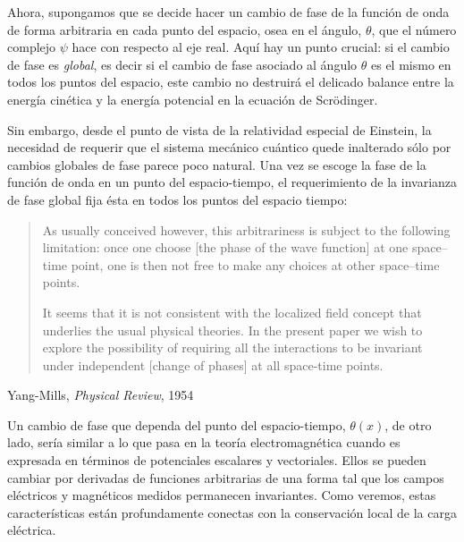 \begin{frame}
Ahora, supongamos que se decide hacer un cambio de fase de la función de onda de forma arbitraria en cada punto del espacio, osea en el ángulo, $\theta$, que el número complejo $\psi$ hace con respecto al eje real. Aquí hay un punto crucial: si el cambio de fase es \emph{global}, es decir si el cambio de fase asociado al ángulo $\theta$ es el mismo en todos los puntos del espacio, este cambio no destruirá el delicado balance entre la energía cinética y la energía potencial en la ecuación de Scrödinger.

Sin embargo, desde el punto de vista de la relatividad especial de Einstein, la necesidad de requerir que el sistema mecánico cuántico quede inalterado sólo por cambios globales de fase parece poco natural. Una vez se escoge la fase de la función de onda en un punto del espacio-tiempo, el requerimiento de la invarianza de fase global fija ésta en todos los puntos del espacio tiempo:

  \begin{quote}
\small
    As usually conceived however, this arbitrariness is subject to the following  limitation: once one choose [the phase of the wave function] at one space--time point, one is then not free to make any choices at other space--time points.

It seems that it is not consistent with the localized field concept that underlies the usual physical theories. In the present paper we wish to explore the possibility of requiring all the interactions to be invariant under independent [change of phases] at all space-time points.
  \end{quote}
  \begin{flushright}
    Yang-Mills, \emph{Physical Review}, 1954
  \end{flushright}

\end{frame}
Un cambio de fase que dependa del punto del espacio-tiempo, $\theta(x)$, de otro lado, sería similar a lo que pasa en la teoría electromagnética cuando es expresada en términos de potenciales escalares y vectoriales. Ellos se pueden cambiar por derivadas de funciones arbitrarias de una forma tal que los campos eléctricos y magnéticos medidos permanecen invariantes. Como veremos, estas características están profundamente conectas con la conservación local de la carga eléctrica.  

